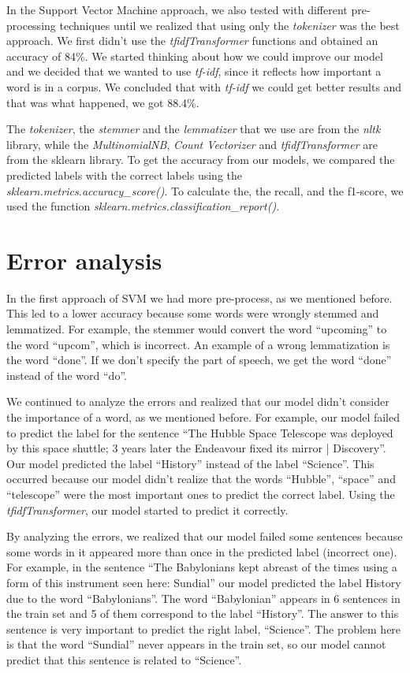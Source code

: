 \documentclass[11pt]{article}
\begin{document}
\begin{multicols}{2}
In the Support Vector Machine approach, we also tested with different pre-processing techniques until we realized that using only the \emph{tokenizer} was the best approach. We first didn’t use the \emph{tfidfTransformer} functions and obtained an accuracy of 84\%. We started thinking about how we could improve our model and we decided that we wanted to use \emph{tf-idf}, since it reflects how important a word is in a corpus. We concluded that with \emph{tf-idf} we could get better results and that was what happened, we got 88.4\%.

The \emph{tokenizer}, the \emph{stemmer} and the \emph{lemmatizer} that we use are from the \emph{nltk} library, while the \emph{MultinomialNB}, \emph{Count Vectorizer} and \emph{tfidfTransformer} are from the sklearn library. To get the accuracy from our models, we compared the predicted labels with the correct labels using the \emph{sklearn.metrics.accuracy\_score()}. To calculate the, the recall, and the f1-score, we used the function \emph{sklearn.metrics.classification\_report()}.

\section{Error analysis}

In the first approach of SVM we had more pre-process, as we mentioned before. This led to a lower accuracy because some words were wrongly stemmed and lemmatized. For example, the stemmer would convert the word “upcoming” to the word “upcom”, which is incorrect. An example of a wrong lemmatization is the word “done”. If we don’t specify the part of speech, we get the word “done” instead of the word “do”.

We continued to analyze the errors and realized that our model didn’t consider the importance of a word, as we mentioned before. For example, our model failed to predict the label for the sentence “The Hubble Space Telescope was deployed by this space shuttle; 3 years later the Endeavour fixed its mirror | Discovery”. Our model predicted the label “History” instead of the label “Science”. This occurred because our model didn’t realize that the words “Hubble”, “space” and “telescope” were the most important ones to predict the correct label. Using the \emph{tfidfTransformer}, our model started to predict it correctly.

By analyzing the errors, we realized that our model failed some sentences because some words in it appeared more than once in the predicted label (incorrect one). For example, in the sentence “The Babylonians kept abreast of the times using a form of this instrument seen here: Sundial” our model predicted the label History due to the word “Babylonians”. The word “Babylonian” appears in 6 sentences in the train set and 5 of them correspond to the label “History”. The answer to this sentence is very important to predict the right label, “Science”. The problem here is that the word “Sundial” never appears in the train set, so our model cannot predict that this sentence is related to “Science”.


\end{multicols}
\end{document}
